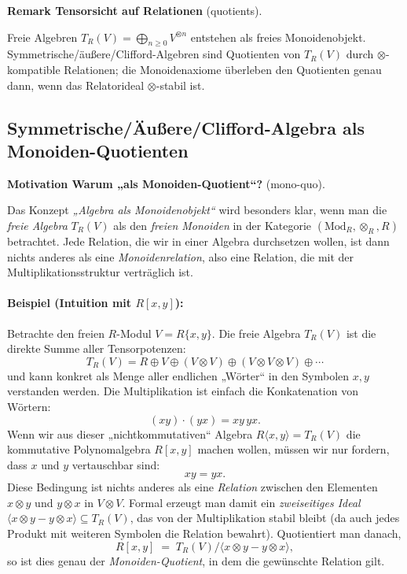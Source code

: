 \documentclass[10pt, letterpaper]{article}
\newcommand{\Mod}{\mathrm{Mod}}
\newcommand{\CustomHeading}[3]{%
  \par\medskip\noindent%
  \textbf{#1 #2} \textnormal{(#3)}.\enskip%
}
\newenvironment{REM}[2]{\begin{unitbox}\CustomHeading{Remark}{#1}{#2}}{\end{unitbox}}
\newenvironment{MOT}[2]{\begin{unitbox}\CustomHeading{Motivation}{#1}{#2}}{\end{unitbox}}
\begin{document}
\begin{REM}{Tensorsicht auf Relationen}{quotients}
Freie Algebren \(T_R(V)=\bigoplus_{n\ge 0}V^{\otimes n}\) entstehen als freies Monoidenobjekt.
Symmetrische/äußere/Clifford-Algebren sind Quotienten von \(T_R(V)\) durch \(\otimes\)-kompatible Relationen; 
die Monoidenaxiome überleben den Quotienten genau dann, wenn das Relatorideal \(\otimes\)-stabil ist.
\end{REM}

\subsection{Symmetrische/Äußere/Clifford-Algebra als Monoiden-Quotienten}
\label{sec:monoid-quotients}




\begin{MOT}{Warum „als Monoiden-Quotient“?}{mono-quo}
Das Konzept \emph{„Algebra als Monoidenobjekt“} wird besonders klar, wenn man die
\emph{freie Algebra} \(T_R(V)\) als den \emph{freien Monoiden} in der Kategorie
\((\Mod_R,\otimes_R,R)\) betrachtet. Jede Relation, die wir in einer Algebra durchsetzen wollen,
ist dann nichts anderes als eine \emph{Monoidenrelation}, also eine Relation, die mit der
Multiplikationsstruktur verträglich ist.

\paragraph{Beispiel (Intuition mit \(R[x,y]\)):}
Betrachte den freien \(R\)-Modul \(V=R\{x,y\}\).
Die freie Algebra \(T_R(V)\) ist die direkte Summe aller Tensorpotenzen:
\[
T_R(V)=R \oplus V \oplus (V\otimes V)\oplus (V\otimes V\otimes V)\oplus\cdots
\]
und kann konkret als Menge aller endlichen „Wörter“ in den Symbolen \(x,y\) verstanden werden.
Die Multiplikation ist einfach die Konkatenation von Wörtern:
\[
(xy)\cdot(yx) = xy\,yx.
\]
Wenn wir aus dieser „nichtkommutativen“ Algebra \(R\langle x,y\rangle=T_R(V)\)
die kommutative Polynom\-algebra \(R[x,y]\) machen wollen,
müssen wir nur fordern, dass \(x\) und \(y\) vertauschbar sind:
\[
xy=yx.
\]
Diese Bedingung ist nichts anderes als eine \emph{Relation} zwischen den Elementen
\(x\otimes y\) und \(y\otimes x\) in \(V\otimes V\).  
Formal erzeugt man damit ein \emph{zweiseitiges Ideal}
\(\langle x\otimes y - y\otimes x\rangle\subseteq T_R(V)\), das von der Multiplikation
stabil bleibt (da auch jedes Produkt mit weiteren Symbolen die Relation bewahrt).  
Quotientiert man danach,
\[
R[x,y]\;=\;T_R(V)\big/\langle x\otimes y-y\otimes x\rangle,
\]
so ist dies genau der \emph{Monoiden-Quotient}, in dem die gewünschte Relation gilt.
\end{MOT}
\end{document}
